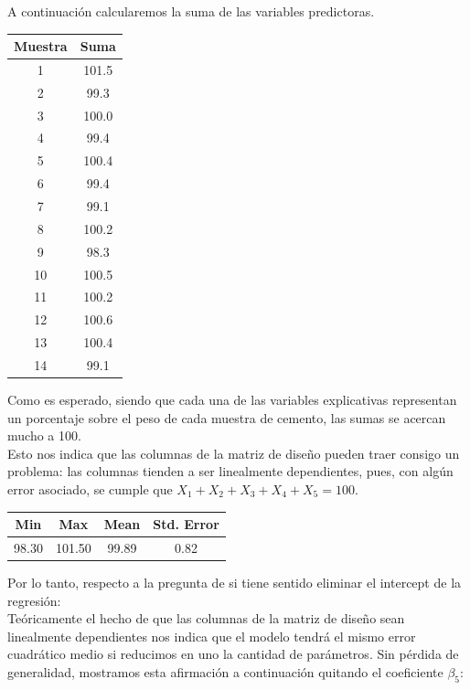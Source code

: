 
A continuación calcularemos la suma de las variables predictoras.
\vskip0.1cm
\begin{minipage}{\linewidth}
  \hspace{0.10\linewidth}
      \begin{minipage}{0.20\linewidth}
        \begin{tabular}{| c | c |}
            \hline
            Muestra & Suma \\ \hline
            1 & 101.5 \\ \hline
            2 & 99.3 \\ \hline
            3 & 100.0 \\ \hline 
            4 & 99.4 \\ \hline
            5 & 100.4 \\ \hline
            6 & 99.4 \\ \hline
            7 & 99.1 \\ \hline
            8 & 100.2 \\ \hline
            9 & 98.3 \\ \hline
            10 & 100.5 \\ \hline
            11 & 100.2 \\ \hline
            12 & 100.6 \\ \hline
            13 & 100.4 \\ \hline
            14 & 99.1 \\ \hline
        \end{tabular}
    \end{minipage}
  \hspace{0.05\linewidth}
  \begin{minipage}{0.50\linewidth}
    \justify
    Como es esperado, siendo que cada una de las variables explicativas representan un porcentaje sobre el peso de cada muestra de cemento, las sumas se acercan mucho a 100.\\
    Esto nos indica que las columnas de la matriz de diseño pueden traer consigo un problema: las columnas tienden a ser linealmente dependientes, pues, con algún error asociado, se cumple que $X_1 + X_2 + X_3 + X_4 + X_5 = 100$.\\
        \begin{center}
            \begin{tabular}{| c | c | c | c |}
                \hline
                Min & Max & Mean & Std. Error \\ \hline
                98.30 & 101.50 & 99.89 & 0.82 \\ \hline
            \end{tabular}       
        \end{center}
  \end{minipage}
\end{minipage}
\vskip0.2cm
Por lo tanto, respecto a la pregunta de si tiene sentido eliminar el intercept de la regresión:\\
Teóricamente el hecho de que las columnas de la matriz de diseño sean linealmente dependientes nos indica que el modelo tendrá el mismo error cuadrático medio si reducimos en uno la cantidad de parámetros. Sin pérdida de generalidad, mostramos esta afirmación a continuación quitando el coeficiente $\beta_5$:

